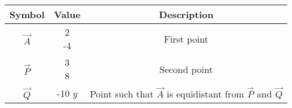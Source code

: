 \begin{tabular}[12pt]{ |c|c|c|}
    \hline
    \textbf{Symbol} & \textbf{Value} & \textbf{Description} \\
    \hline
    $\vec{A}$ & \myvec{2\\-4} & First point\\
    \hline 
    $\vec{P}$ & \myvec{3\\8} & Second point\\
    \hline
	$\vec{Q}$ & \myvec{-10\\$y$} & Point such that $\vec{A}$ is equidistant from $\vec{P}$ and $\vec{Q}$\\
    \hline
    \end{tabular}
